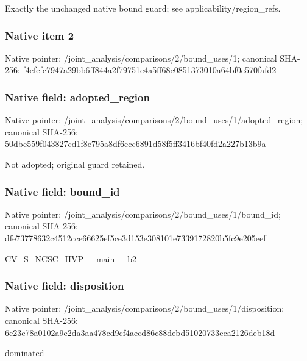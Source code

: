 \documentclass[10pt,a4paper]{article}
\begin{document}
\begingroup\raggedright\sloppy Exactly the unchanged native bound guard;\allowbreak{} see applicability/\allowbreak{}region\_\allowbreak{}refs.\par\endgroup

\subsubsection{Native item 2}
Native pointer: /joint\_\allowbreak{}analysis/comparisons/2/bound\_\allowbreak{}uses/1; canonical SHA-256: f4efefc7947a29bb6ff844a2f79751c4a5ff68c0851373010a64bf0c570fafd2

\subsubsection{Native field: adopted\_\allowbreak{}region}
Native pointer: /joint\_\allowbreak{}analysis/comparisons/2/bound\_\allowbreak{}uses/1/adopted\_\allowbreak{}region; canonical SHA-256: 50dbe559f043827cd1f8e795a8df6ecc6891d58f5ff3416bf40fd2a227b13b9a

\begingroup\raggedright\sloppy Not adopted;\allowbreak{} original guard retained.\par\endgroup

\subsubsection{Native field: bound\_\allowbreak{}id}
Native pointer: /joint\_\allowbreak{}analysis/comparisons/2/bound\_\allowbreak{}uses/1/bound\_\allowbreak{}id; canonical SHA-256: dfe73778632c4512cce66625ef5ce3d153e308101e7339172820b5fc9e205eef

\begingroup\raggedright\sloppy CV\_\allowbreak{}S\_\allowbreak{}NCSC\_\allowbreak{}HVP\_\allowbreak{}\_\allowbreak{}main\_\allowbreak{}\_\allowbreak{}b2\par\endgroup

\subsubsection{Native field: disposition}
Native pointer: /joint\_\allowbreak{}analysis/comparisons/2/bound\_\allowbreak{}uses/1/disposition; canonical SHA-256: 6c23c78a0102a9e2da3aa478cd9cf4aecd86c88debd51020733eca2126deb18d

\begingroup\raggedright\sloppy dominated\par\endgroup
\end{document}
